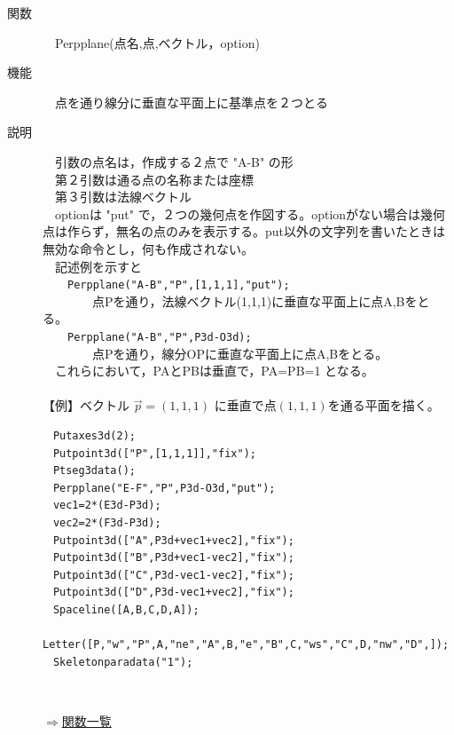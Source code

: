 \documentclass[papersize,a4paper,12pt,uplatex]{jsarticle}
\begin{document}
\begin{description}
\hypertarget{perpplane}{}
\item[関数]　Perpplane(点名,点,ベクトル，option)
\item[機能]　点を通り線分に垂直な平面上に基準点を２つとる
\item[説明]　引数の点名は，作成する２点で "A-B" の形\\
　第２引数は通る点の名称または座標\\
　第３引数は法線ベクトル\\
　optionは "put"  で，２つの幾何点を作図する。optionがない場合は幾何点は作らず，無名の点のみを表示する。put以外の文字列を書いたときは無効な命令とし，何も作成されない。\\
　記述例を示すと\\
　　\verb|Perpplane("A-B","P",[1,1,1],"put");|\\
　　　　点Pを通り，法線ベクトル(1,1,1)に垂直な平面上に点A,Bをとる。\\
　　\verb|Perpplane("A-B","P",P3d-O3d);|\\
　　　　点Pを通り，線分OPに垂直な平面上に点A,Bをとる。\\
　これらにおいて，PAとPBは垂直で，PA=PB=1 となる。\\
　\\
【例】ベクトル $\vec{p}=(1,1,1)$ に垂直で点$(1,1,1)$を通る平面を描く。
\begin{verbatim}
　Putaxes3d(2);
　Putpoint3d(["P",[1,1,1]],"fix");
　Ptseg3data();
　Perpplane("E-F","P",P3d-O3d,"put");
　vec1=2*(E3d-P3d);
　vec2=2*(F3d-P3d);
　Putpoint3d(["A",P3d+vec1+vec2],"fix");
　Putpoint3d(["B",P3d+vec1-vec2],"fix");
　Putpoint3d(["C",P3d-vec1-vec2],"fix");
　Putpoint3d(["D",P3d-vec1+vec2],"fix");
　Spaceline([A,B,C,D,A]);
　Letter([P,"w","P",A,"ne","A",B,"e","B",C,"ws","C",D,"nw","D",]);
　Skeletonparadata("1");
\end{verbatim}
　　　　　　　　  
\begin{flushright} \hyperlink{functionlist3d}{$\Rightarrow$関数一覧}\end{flushright}
　\\


\end{description}
\end{document}
